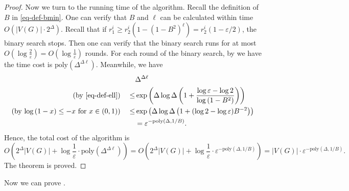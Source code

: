 \documentclass[11pt]{article}
\newcommand{\abs}[1]{\left\vert#1\right\vert}
\def\poly{\mathrm{poly}}
\begin{document}
\begin{proof}
    Now we turn to the running time of the algorithm. 
    Recall the definition of $B$ in \eqref{eq-def-bmin}.
    One can verify that $B$ and $\ell$ can be calculated within time $O(\abs{V(G)}\cdot 2^{\Delta})$.
    Recall that if $r^i_1 \geq r^i_2\left(1 - \left(1 - B^2\right)^{\ell}\right) = r^i_2(1 - \varepsilon/2)$, the binary search stops.
    Then one can verify that the binary search runs for at most $O(\log \frac{2}{\varepsilon}) =  O(\log \frac{1}{\varepsilon})$ rounds. 
    For each round of the binary search, by  we have the time cost is $\poly\left(\Delta^{\Delta \ell}\right)$.
    Meanwhile, we have
    \begin{align*}
        &\Delta^{\Delta \ell} \\
    \left(\text{by \eqref{eq-def-ell}}\right)\quad   \le &\exp\left(\Delta \log{\Delta} \left(1 + \frac{\log{\varepsilon} - \log 2}{\log\left(1 - B^2\right)}\right)\right) \\
        (\mbox{by $\log{(1 - x)} \leq  -x$ for $x\in (0,1)$}) \quad
        \le & \exp\left(\Delta \log{\Delta} \left(1 + (\log 2 - \log{\varepsilon}) B^{-2}\right)\right) \\
        &= \varepsilon^{-\poly(\Delta, 1/B)}.
    \end{align*}
    Hence, the total cost of the algorithm is 
    \[O\left(2^{\Delta}\abs{V(G)} +\log \frac{1}{\varepsilon} \cdot \poly\left(\Delta^{\Delta \ell}\right)\right) = O\left(2^{\Delta}\abs{V(G)} +\log \frac{1}{\varepsilon} \cdot \varepsilon^{-\poly(\Delta, 1/B)}\right) = \abs{V(G)}\cdot\varepsilon^{-\poly(\Delta, 1/B)}.\]
    The theorem is proved.
\end{proof}

Now we can prove .
\end{document}
